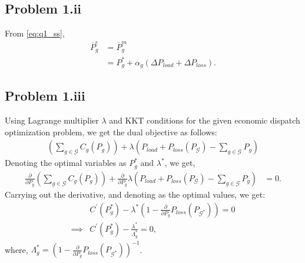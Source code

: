 \subsection*{Problem 1.ii}
From \ref{eq:q1_ss},
\begin{align*}
	\overline{P}_g^e &= \overline{P}_g^m\\
	&= P_{g}^*+\alpha_g \left(\Delta P_{load} + \Delta P_{loss}\right).
\end{align*}
\subsection*{Problem 1.iii}
Using Lagrange multiplier $\lambda$ and KKT conditions for the given economic dispatch optimization problem, we get the dual objective as follows:
\begin{align*}
	\left(\sum_{g \in \mathcal{G}}C_g(P_g)\right) + \lambda \left(P_{load}+P_{loss}(P_{\mathcal{G}}) - \sum_{g\in \mathcal{G}}P_g\right)
\end{align*}
Denoting the optimal variables as $P_g^*$ and $\lambda^*$, we get,
\begin{align*}
	\frac{\partial}{\partial P_g} \left(\sum_{g \in \mathcal{G}}C_g(P_g)\right)+\frac{\partial}{\partial P_g}\lambda \left(P_{load}+P_{loss}(P_{\mathcal{G}}) - \sum_{g\in \mathcal{G}}P_g\right) &= 0.
\end{align*}
Carrying out the derivative, and denoting  as the optimal values, we get:
\begin{align}\label{eq:q1_kkt}
	& C^{\prime}(P_g^*) - \lambda^* \left(1-\frac{\partial}{\partial P_g}P_{loss}(P_{\mathcal{G}^*})\right) = 0 \nonumber\\
	\implies & C^{\prime}(P_g^*) - \frac{\lambda^*}{\Lambda_g^*} = 0,
\end{align}
where, $\Lambda_g^* = \left(1-\frac{\partial}{\partial P_g}P_{loss}(P_{\mathcal{G}^*})\right)^{-1}$.

